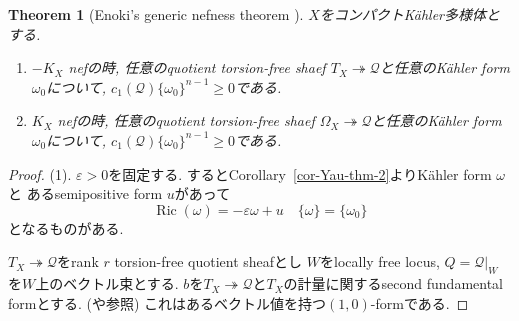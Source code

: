 \documentclass[dvipdfmx,a4paper,11pt]{article} %
\newtheorem{thm}{Theorem}[section]
\theoremstyle{definition}
\theoremstyle{remark}
\numberwithin{equation}{section}
\DeclareMathOperator{\Ric}{Ric}
\begin{document}
 
 \begin{thm}[Enoki's generic nefness theorem {\cite{Eno88, Cao13}}]
 \label{thm-Enoki-genericneff}
$X$をコンパクトK\"ahler多様体とする. 
\begin{enumerate}
\item $-K_X$ nefの時, 任意のquotient torsion-free shaef
$T_X \twoheadrightarrow \mathcal{Q}$と任意のK\"ahler form$\omega_0$について, $c_1(\mathcal{Q}) \{ \omega_0\}^{n-1} \geq 0$である. 
\item $K_X$ nefの時, 任意のquotient torsion-free shaef
$\Omega_X \twoheadrightarrow \mathcal{Q}$と任意のK\"ahler form $\omega_0$について, $c_1(\mathcal{Q}) \{ \omega_0\}^{n-1} \geq 0$である. 
\end{enumerate}
 \end{thm}
 \begin{proof}
 (1). $\varepsilon>0$を固定する.
 するとCorollary~\ref{cor-Yau-thm-2}よりK\"ahler form $\omega$と
 あるsemipositive form $u$があって
 \begin{equation}
 \label{eq-antinef-kahler}
 \Ric(\omega)
 =- \varepsilon \omega + u
 \quad 
\{\omega\}=\{\omega_0\}
 \end{equation}
 となるものがある. 

 $T_X \twoheadrightarrow \mathcal{Q}$をrank $r$ torsion-free quotient sheafとし
 $W$をlocally free locus, $Q=\mathcal{Q}\vert_{W}$を$W$上のベクトル束とする. 
 $b$を$T_X \twoheadrightarrow \mathcal{Q}$と$T_X$の計量に関するsecond fundamental formとする. (\cite[Section 11]{Dem12}や\cite[Subsection 5.7]{Iwa-Chern}参照)
 これはあるベクトル値を持つ$(1,0)$-formである. 
 

\end{proof}
\end{document}
